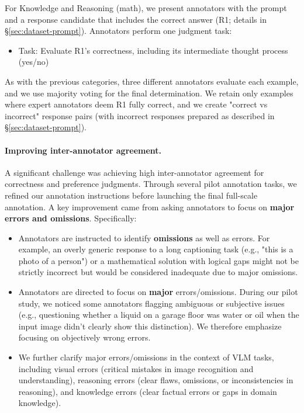 For Knowledge and Reasoning (math), we present annotators with the prompt and a response candidate that includes the correct answer (R1; details in \S \ref{sec:dataset-prompt}). Annotators perform one judgment task: 
\vspace{-0mm}
\begin{itemize}
\setlength{\leftskip}{0mm}
\setlength{\itemsep}{-0mm}
    \item[] Task: Evaluate R1's correctness, including its intermediate thought process (yes/no)
    \vspace{-0mm}
\end{itemize}
As with the previous categories, three different annotators evaluate each example, and we use majority voting for the final determination. We retain only examples where expert annotators deem R1 fully correct, and we create "correct vs incorrect" response pairs (with incorrect responses prepared as described in \S \ref{sec:dataset-prompt}).


\paragraph{Improving inter-annotator agreement.}
A significant challenge was achieving high inter-annotator agreement for correctness and preference judgments. Through several pilot annotation tasks, we refined our annotation instructions before launching the final full-scale annotation. A key improvement came from asking annotators to focus on \textbf{major errors and omissions}. Specifically:
\begin{itemize}
\setlength{\leftskip}{0mm}
    \item Annotators are instructed to identify \textbf{omissions} as well as errors. For example, an overly generic response to a long captioning task (e.g., "this is a photo of a person") or a mathematical solution with logical gaps might not be strictly incorrect but would be considered inadequate due to major omissions.
    \item Annotators are directed to focus on \textbf{major} errors/omissions. During our pilot study, we noticed some annotators flagging ambiguous or subjective issues (e.g., questioning whether a liquid on a garage floor was water or oil when the input image didn't clearly show this distinction). We therefore emphasize focusing on {objectively} wrong errors.
    \item We further clarify major errors/omissions in the context of VLM tasks, including visual errors (critical mistakes in image recognition and understanding), reasoning errors (clear flaws, omissions, or inconsistencies in reasoning), and knowledge errors (clear factual errors or gaps in domain knowledge).
\end{itemize}

